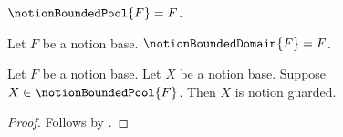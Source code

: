 

\begin{definition}\label{notion_bounded_pool}
    $\notionBoundedPool{F}=F$.
\end{definition}

\begin{definition}\label{notion_bounded_domain}
    Let $F$ be a notion base.
    $\notionBoundedDomain{F}=F$.
\end{definition}

\begin{classification}\label{notion_bounded_pool_guarded}
    Let $F$ be a notion base.
    Let $X$ be a notion base.
    Suppose $X\in\notionBoundedPool{F}$.
    Then $X$ is notion guarded.
\end{classification}
\begin{proof}
    Follows by .
\end{proof}

